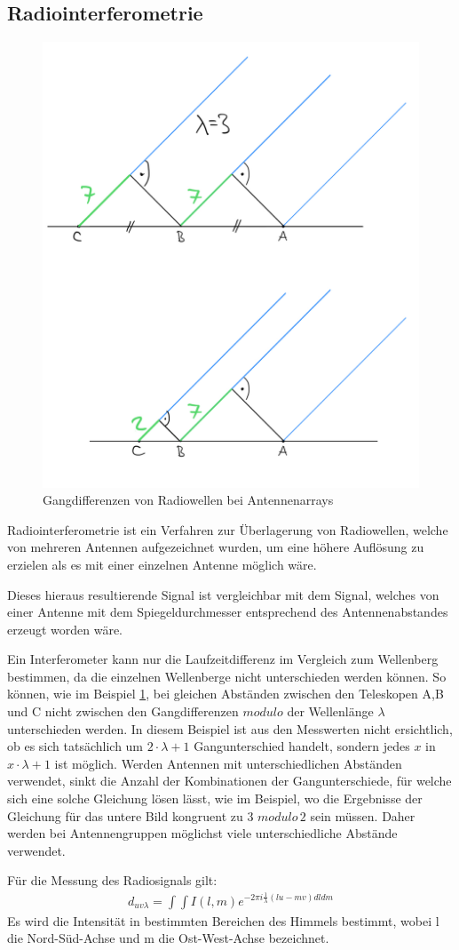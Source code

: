 \documentclass[]{dsadokumentation}
\begin{document}
\subsection{Radiointerferometrie}
\begin{figure}[htb]
\centering
\includegraphics[width=.4\textwidth]{k4.2/baselineunterschied.png}
\caption{Gangdifferenzen von Radiowellen bei Antennenarrays}
\label{bild-baselineunterschied}
\end{figure}

Radiointerferometrie ist ein Verfahren zur Überlagerung von Radiowellen, welche von mehreren Antennen aufgezeichnet wurden, um eine höhere Auflösung zu erzielen als es mit einer einzelnen Antenne möglich wäre.

Dieses hieraus resultierende Signal ist vergleichbar mit dem Signal, welches von einer Antenne mit dem Spiegeldurchmesser entsprechend des Antennenabstandes erzeugt worden wäre.

Ein Interferometer kann nur die Laufzeitdifferenz im Vergleich zum Wellenberg bestimmen, da die einzelnen Wellenberge nicht unterschieden werden können. So können, wie im Beispiel  \ref{bild-baselineunterschied}, bei gleichen Abständen zwischen den Teleskopen A,B und C nicht zwischen den Gangdifferenzen $modulo$ der Wellenlänge $\lambda$ unterschieden werden. In diesem Beispiel ist aus den Messwerten nicht ersichtlich, ob es sich tatsächlich um $2\cdot \lambda +1$ Gangunterschied handelt, sondern jedes $x$ in $x\cdot\lambda+1$ ist möglich. Werden Antennen mit unterschiedlichen Abständen verwendet, sinkt die Anzahl der Kombinationen der Gangunterschiede, für welche sich eine solche Gleichung lösen lässt, wie im Beispiel, wo die Ergebnisse der Gleichung für das untere Bild kongruent zu 3 $modulo\,2$ sein müssen. Daher werden bei Antennengruppen möglichst viele unterschiedliche Abstände verwendet.

Für die Messung des Radiosignals gilt:
\begin{eqnarray}
d_{uv\lambda} =\int\int I(l,m)e^{-2\pi i \frac{1}{\lambda}(lu-mv)dldm}
\end{eqnarray}
Es wird die Intensität in bestimmten Bereichen des Himmels bestimmt, wobei l die Nord-Süd-Achse und m die Ost-West-Achse bezeichnet.
\end{document}
